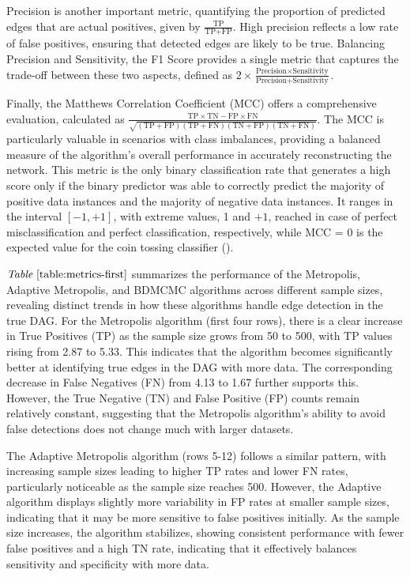 \documentclass{report}
\begin{document}
Precision is another important metric, quantifying the proportion of predicted edges that are actual positives, given by $\frac{\text{TP}}{\text{TP} + \text{FP}}$. High precision reflects a low rate of false positives, ensuring that detected edges are likely to be true. Balancing Precision and Sensitivity, the F1 Score provides a single metric that captures the trade-off between these two aspects, defined as $2 \times \frac{\text{Precision} \times \text{Sensitivity}}{\text{Precision} + \text{Sensitivity}}$.

Finally, the Matthews Correlation Coefficient (MCC) offers a comprehensive evaluation, calculated as $\frac{\text{TP} \times \text{TN} - \text{FP} \times \text{FN}}{\sqrt{(\text{TP} + \text{FP})(\text{TP} + \text{FN})(\text{TN} + \text{FP})(\text{TN} + \text{FN})}}$. The MCC is particularly valuable in scenarios with class imbalances, providing a balanced measure of the algorithm’s overall performance in accurately reconstructing the network.
This metric is the only binary classification rate that generates a high score only if the binary predictor was able to correctly predict the majority of positive data instances and the majority of negative data instances. It ranges in the interval $[ -1, +1]$, with extreme values, 1 and $+ 1$, reached in case of perfect misclassification and perfect classification, respectively, while MCC = 0 is the expected value for the coin tossing classifier (\citet{chicco2020advantages}).    

$\textit{Table} \  \ref{table:metrics-first}$ summarizes the performance of the Metropolis, Adaptive Metropolis, and BDMCMC algorithms across different sample sizes, revealing distinct trends in how these algorithms handle edge detection in the true DAG. For the Metropolis algorithm (first four rows), there is a clear increase in True Positives (TP) as the sample size grows from 50 to 500, with TP values rising from 2.87 to 5.33. This indicates that the algorithm becomes significantly better at identifying true edges in the DAG with more data. The corresponding decrease in False Negatives (FN) from 4.13 to 1.67 further supports this. However, the True Negative (TN) and False Positive (FP) counts remain relatively constant, suggesting that the Metropolis algorithm’s ability to avoid false detections does not change much with larger datasets.

The Adaptive Metropolis algorithm (rows 5-12) follows a similar pattern, with increasing sample sizes leading to higher TP rates and lower FN rates, particularly noticeable as the sample size reaches 500. However, the Adaptive algorithm displays slightly more variability in FP rates at smaller sample sizes, indicating that it may be more sensitive to false positives initially. As the sample size increases, the algorithm stabilizes, showing consistent performance with fewer false positives and a high TN rate, indicating that it effectively balances sensitivity and specificity with more data.
\end{document}
